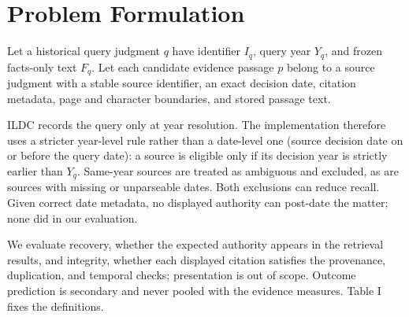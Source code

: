\documentclass[conference]{IEEEtran}
\begin{document}
\section{Problem Formulation}
Let a historical query judgment $q$ have identifier $I_q$, query year $Y_q$, and frozen facts-only text $F_q$. Let each candidate evidence passage $p$ belong to a source judgment with a stable source identifier, an exact decision date, citation metadata, page and character boundaries, and stored passage text.

ILDC records the query only at year resolution. The implementation therefore uses a stricter year-level rule rather than a date-level one (source decision date on or before the query date): a source is eligible only if its decision year is strictly earlier than $Y_q$. Same-year sources are treated as ambiguous and excluded, as are sources with missing or unparseable dates. Both exclusions can reduce recall. Given correct date metadata, no displayed authority can post-date the matter; none did in our evaluation.

We evaluate recovery, whether the expected authority appears in the retrieval results, and integrity, whether each displayed citation satisfies the provenance, duplication, and temporal checks; presentation is out of scope. Outcome prediction is secondary and never pooled with the evidence measures. Table I fixes the definitions.
\end{document}
